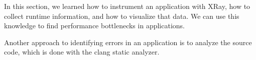 In this section, we learned how to instrument an application with XRay, how to collect runtime information, and how to visualize that data. We can use this knowledge to find performance bottlenecks in applications.

Another approach to identifying errors in an application is to analyze the source code, which is done with the clang static analyzer.
























